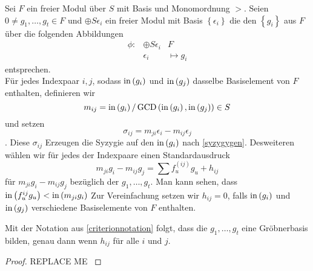 \documentclass{article}
\begin{document}
\begin{nota}
	Sei 
	\( F \) 
	ein freier Modul \"uber
	\(S\)
	mit Basis und Monomordnung
	\( > \).
	Seien
	\( 0 \neq g_{1},\dots,g_{t} \in F\)
	und 
	\( \oplus S \epsilon_{i} \)
	ein freier Modul mit Basis 
	\( \left\{ \epsilon_{i} \right\} \)
	die den 
	\( \left\{ g_{i} \right\}\)
	aus 
	\( F \)
	\"uber die folgenden Abbildungen 
	\begin{align*}
		\phi:& \oplus S \epsilon_{i} & F \\
		& \epsilon_{i} & \mapsto g_{i} 
	\end{align*}
	entsprechen. \\
	F\"ur jedes Indexpaar 
	\( i, j \),
	sodass 
	\( \operatorname{in} \left( g_{i} \right) \)
	und
	\( \operatorname{in} \left( g_{j} \right) \)
	dasselbe Basiselement von
	\( F \)
	enthalten,
	definieren wir
	\[
		m_{ij} = \operatorname{in} \left( g_{i} \right) / \operatorname{GCD} \left( \operatorname{in}\left( g_{i} \right), \operatorname{in} \left( g_{j} \right) \right) \in S
	\]
	und setzen
	\[
		\sigma_{ij} 
		= m_{ji} \epsilon_{i} 
		- m_{ij} \epsilon_{j}
	\].
	Diese 
	\( \sigma_{ij} \)
	Erzeugen die Syzygie auf den 
	\( \operatorname{in} \left( g_{i} \right) \)
	nach \ref{syzygygen}.
	Desweiteren w\"ahlen wir f\"ur jedes der Indexpaare einen Standardausdruck 
	\[ 
		m_{ji} g_{i} -m_{ij} g_{j} = \sum f_{u}^{\left( ij \right) } g_{u} + h_{ij}
	\]
	f\"ur 
	\(  m_{ji} g_{i} -m_{ij} g_{j} \)
	bez\"uglich der
	\( g_{1},\dots , g_{t} \).
	Man kann sehen, 
	dass 
	\( \operatorname{in} \left( f_{u}^{ij} g_{u} \right) < \operatorname{in} \left( m_{ji}g_{i} \right) \)
	Zur Vereinfachung setzen wir
	\( h_{ij} = 0 \),
	falls 
	\( \operatorname{in}\left( g_{i} \right) \)
	und 
	\( \operatorname{in}\left( g_{j} \right) \)
	verschiedene Basiselemente von 
	\( F \)
	enthalten.
\end{nota}
\begin{thm}
	Mit der Notation aus \ref{criterionnotation} folgt,
	dass die 
	\( g_{1},\dots,g_{t} \)
	eine Gr\"obnerbasis bilden,
	genau dann wenn 
	\( h_{ij} \)
	f\"ur alle 
	\( i \)
	und 
	\( j\).
	\begin{proof}
		{\color{red} REPLACE ME }
	\end{proof}
\end{thm}
\end{document}
